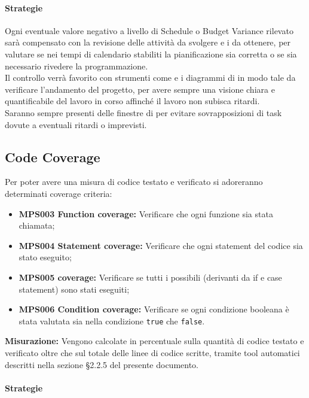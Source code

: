 \documentclass[NormeDiProgetto.tex]{subfiles}
\begin{document}
	\paragraph{Strategie}
	Ogni eventuale valore negativo a livello di Schedule o Budget Variance rilevato sarà compensato con la revisione delle attività da svolgere e i  da ottenere, per valutare se nei tempi di calendario stabiliti la pianificazione sia corretta o se sia necessario rivedere la programmazione.\\
	Il controllo verrà favorito con strumenti come  e i diagrammi di  in modo tale da verificare l'andamento del progetto, per avere sempre una visione chiara e quantificabile del lavoro in corso affinché il lavoro non subisca ritardi.\\
	Saranno sempre presenti delle finestre di  per evitare sovrapposizioni di task dovute a eventuali ritardi o imprevisti. 
	
	\subsection{Code Coverage}
	Per poter avere una misura di codice testato e verificato si adoreranno determinati coverage criteria:
	
	\begin{itemize}
		\item \textbf{MPS003 Function coverage:} Verificare che ogni funzione sia stata chiamata;
		\item \textbf{MPS004 Statement coverage:} Verificare che ogni statement del codice sia stato eseguito; 
		\item \textbf{MPS005  coverage:} Verificare se tutti i possibili  (derivanti da if e case statement) sono stati eseguiti;
		\item \textbf{MPS006 Condition coverage:} Verificare se ogni condizione booleana è stata valutata sia nella condizione \texttt{true} che \texttt{false}. 
		
	\end{itemize}
	\textbf{Misurazione:}
	Vengono calcolate in percentuale sulla quantità di codice testato e verificato oltre che sul totale delle linee di codice scritte, tramite tool automatici descritti nella sezione \S 2.2.5 del presente documento.
	
	\paragraph{Strategie}
	
\end{document}
